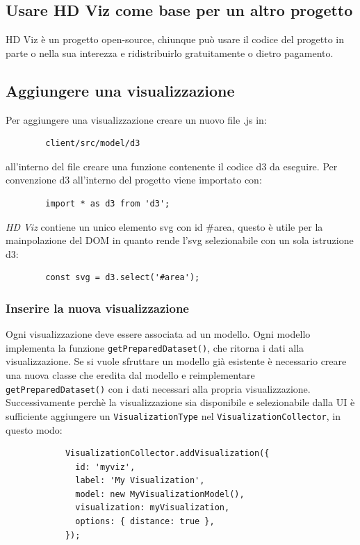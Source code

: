     \subsection{Usare HD Viz come base per un altro progetto}
    HD Viz è un progetto open-source, chiunque può usare il codice del progetto in parte o nella sua interezza e ridistribuirlo gratuitamente o dietro pagamento.
    \subsection{Aggiungere una visualizzazione}
    Per aggiungere una visualizzazione creare un nuovo file .js in:
    \begin{verbatim}
        client/src/model/d3
    \end{verbatim}
    all'interno del file creare una funzione contenente il codice d3 da eseguire. Per convenzione d3 all'interno del progetto viene importato con:
    \begin{verbatim}
        import * as d3 from 'd3';
    \end{verbatim}
    \textit{HD Viz} contiene un unico elemento svg con id \#area, questo è utile per la mainpolazione del DOM in quanto rende l'svg selezionabile con un sola istruzione d3:
    \begin{verbatim}
        const svg = d3.select('#area');
    \end{verbatim}
        \subsubsection{Inserire la nuova visualizzazione}
        Ogni visualizzazione deve essere associata ad un modello. Ogni modello implementa la funzione  \texttt{getPreparedDataset()}, che ritorna i dati alla visualizzazione. Se si vuole sfruttare un modello già esistente è necessario creare una nuova classe che eredita dal modello e reimplementare \texttt{getPreparedDataset()} con i dati necessari alla propria visualizzazione. Successivamente perchè la visualizzazione sia disponibile e selezionabile dalla UI è sufficiente aggiungere un \texttt{VisualizationType} nel \texttt{VisualizationCollector}, in questo modo:
        \begin{verbatim}
            VisualizationCollector.addVisualization({
              id: 'myviz',
              label: 'My Visualization',
              model: new MyVisualizationModel(),
              visualization: myVisualization,
              options: { distance: true },
            });
        \end{verbatim}
        
